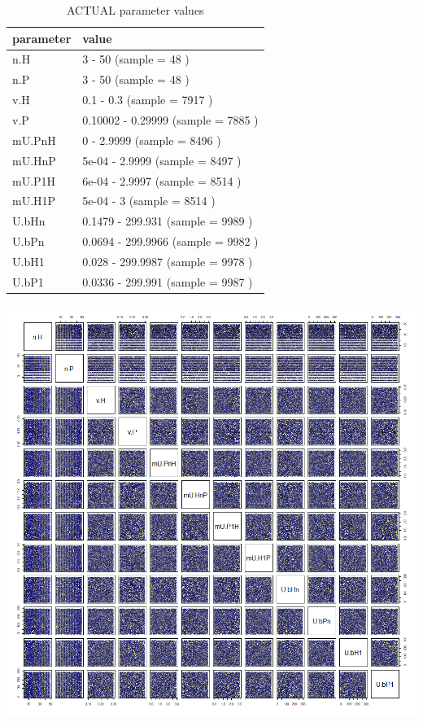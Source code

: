 \documentclass[]{book}
\begin{document}
\begin{table}[!h]

\caption{\label{tab:5LHCtablepdf}ACTUAL parameter values}
\centering
\begin{tabular}{l|l}
\hline
parameter & value\\
\hline
n.H & 3 - 50 (sample = 48 )\\
\hline
n.P & 3 - 50 (sample = 48 )\\
\hline
v.H & 0.1 - 0.3 (sample = 7917 )\\
\hline
v.P & 0.10002 - 0.29999 (sample = 7885 )\\
\hline
mU.PnH & 0 - 2.9999 (sample = 8496 )\\
\hline
mU.HnP & 5e-04 - 2.9999 (sample = 8497 )\\
\hline
mU.P1H & 6e-04 - 2.9997 (sample = 8514 )\\
\hline
mU.H1P & 5e-04 - 3 (sample = 8514 )\\
\hline
U.bHn & 0.1479 - 299.931 (sample = 9989 )\\
\hline
U.bPn & 0.0694 - 299.9966 (sample = 9982 )\\
\hline
U.bH1 & 0.028 - 299.9987 (sample = 9978 )\\
\hline
U.bP1 & 0.0336 - 299.991 (sample = 9987 )\\
\hline
\end{tabular}
\end{table}

\newpage

\includegraphics[width=1\linewidth]{plots/5_multiplePar-LHC_pairs-plot}
\end{document}
